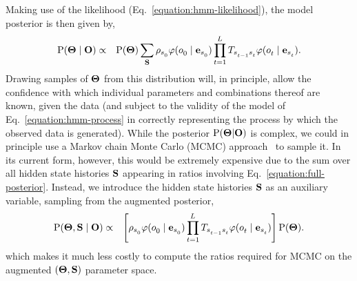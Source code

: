 \documentclass[aps,pre,twocolumn,superscriptaddress,nofootinbib,longbibliography]{revtex4-1}
\newcommand{\bfm}[1]{{\bf #1}}
\renewcommand{\Pr}{\mathrm{P}}
\begin{document}
{Making use of the likelihood (Eq.~\ref{equation:hmm-likelihood}), the model posterior is then given by,
\begin{eqnarray}
\Pr(\bfm{\Theta} \mid \bfm{O}) &\propto& \Pr(\bfm{\Theta}) \sum_{\bfm{S}}\rho_{s^{}_{0}} \varphi(o^{}_{0} \mid \bfm{e}_{s^{}_{0}}) \prod_{t=1}^{L^{}} T_{s^{}_{t-1} s^{}_{t}} \varphi(o^{}_{t} \mid \bfm{e}_{s^{}_{t}})  \label{equation:full-posterior} .
\end{eqnarray}
Drawing samples of $\bfm{\Theta}$ from this distribution will, in principle, allow the confidence with which individual parameters and combinations thereof are known, given the data (and subject to the validity of the model of Eq.~\ref{equation:hmm-process} in correctly representing the process by which the observed data is generated).
While the posterior $\Pr(\bfm{\Theta}|\bfm{O})$ is complex, we could in principle use a Markov chain Monte Carlo (MCMC) approach~\cite{jun-s-liu:mcmc} to sample it.
In its current form, however, this would be extremely expensive due to the sum over all hidden state histories $\bfm{S}$ appearing in ratios involving Eq.~\ref{equation:full-posterior}.
Instead, we introduce the hidden state histories $\bfm{S}$ as an auxiliary variable, sampling from the augmented posterior,
\begin{eqnarray}
\Pr(\bfm{\Theta}, \bfm{S} \mid \bfm{O}) &\propto& \left[ \rho_{s^{}_{0}} \varphi(o^{}_{0} \mid \bfm{e}_{s^{}_{0}}) \prod_{t=1}^{L^{}} T_{s^{}_{t-1} s^{}_{t}} \varphi(o^{}_{t} \mid \bfm{e}_{s^{}_{t}}) \right] \Pr(\bfm{\Theta}) . \nonumber \\\label{equation:augmented-posterior} 
\end{eqnarray}
which makes it much less costly to compute the ratios required for MCMC on the augmented $(\bfm{\Theta},\bfm{S})$ parameter space.

}
\end{document}
